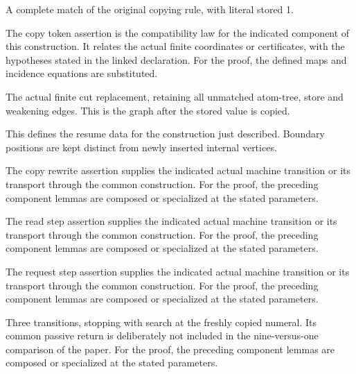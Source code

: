A complete match of the original copying rule, with literal stored 1.
\par{}

The copy token assertion is the compatibility law for the indicated component of this construction. It relates the actual finite coordinates or certificates, with the hypotheses stated in the linked declaration.
For the proof, the defined maps and incidence equations are substituted.
\par{}

The actual finite cut replacement, retaining all unmatched atom-tree, store and weakening edges. This is the graph after the stored value is copied.
\par{}

This defines the resume data for the construction just described. Boundary positions are kept distinct from newly inserted internal vertices.
\par{}

The copy rewrite assertion supplies the indicated actual machine transition or its transport through the common construction.
For the proof, the preceding component lemmas are composed or specialized at the stated parameters.
\par{}

The read step assertion supplies the indicated actual machine transition or its transport through the common construction.
For the proof, the preceding component lemmas are composed or specialized at the stated parameters.
\par{}

The request step assertion supplies the indicated actual machine transition or its transport through the common construction.
For the proof, the preceding component lemmas are composed or specialized at the stated parameters.
\par{}

Three transitions, stopping with search at the freshly copied numeral. Its common passive return is deliberately not included in the nine-versus-one comparison of the paper.
For the proof, the preceding component lemmas are composed or specialized at the stated parameters.
\par{}

